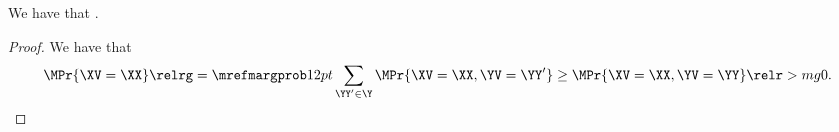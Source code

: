 \begin{proposition}
  We have that \marggimplprop.%
\end{proposition}

\begin{proof}
  We have that
  $$\MPr{\XV = \XX} \relrg = {\mrefmargprob} 12pt \sum_{\YY' \in \Y} \MPr{\XV = \XX, \YV = \YY'} \ge \MPr{\XV = \XX, \YV = \YY} \relr > mg 0.$$%
\end{proof}
